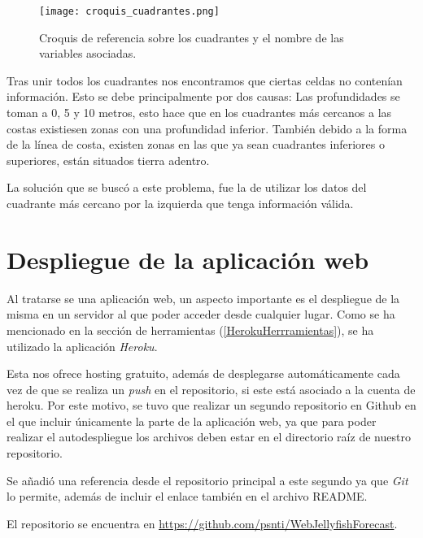 \begin{figure}%
	\centering
	\texttt{[image: croquis\_cuadrantes.png]}
	\caption[Croquis de referencia sobre los cuadrantes y el nombre de las variables asociadas.]{Croquis de referencia sobre los cuadrantes y el nombre de las variables asociadas.}\label{croquis_cuadrantes}
\end{figure}

Tras unir todos los cuadrantes nos encontramos que ciertas celdas no contenían información. Esto se debe principalmente por dos causas: Las profundidades se toman a 0, 5 y 10 metros, esto hace que en los cuadrantes más cercanos a las costas existiesen zonas con una profundidad inferior. También debido a la forma de la línea de costa, existen zonas en las que ya sean cuadrantes inferiores o superiores, están situados tierra adentro.

La solución que se buscó a este problema, fue la de utilizar los datos del cuadrante más cercano por la izquierda que tenga información válida.

\section{Despliegue de la aplicación web}
Al tratarse se una aplicación web, un aspecto importante es el despliegue de la misma en un servidor al que poder acceder desde cualquier lugar. Como se ha mencionado en la sección de herramientas (\ref{HerokuHerrramientas}), se ha utilizado la aplicación \emph{Heroku}.

Esta nos ofrece hosting gratuito, además de desplegarse automáticamente cada vez de que se realiza un \emph{push} en el repositorio, si este está asociado a la cuenta de heroku. Por este motivo, se tuvo que realizar un segundo repositorio en Github en el que incluir únicamente la parte de la aplicación web, ya que para poder realizar el autodespliegue los archivos deben estar en el directorio raíz de nuestro repositorio.

Se añadió una referencia desde el repositorio principal a este segundo ya que \emph{Git} lo permite, además de incluir el enlace también en el archivo README. 

El repositorio se encuentra en \url{https://github.com/psnti/WebJellyfishForecast}.



